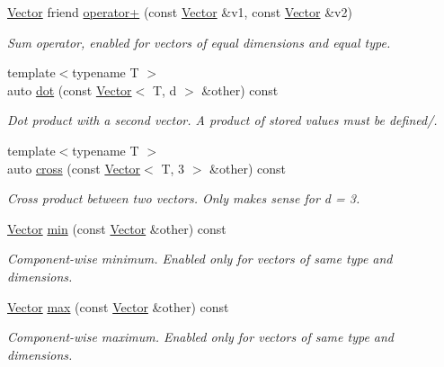 \begin{DoxyCompactItemize}
\hyperlink{classVector}{Vector} friend \hyperlink{classVector_a2f7c7d1b093fc195c0ca3ae40bd87cfc}{operator+} (const \hyperlink{classVector}{Vector} \&v1, const \hyperlink{classVector}{Vector} \&v2)
\begin{DoxyCompactList}\small\item\em Sum operator, enabled for vectors of equal dimensions and equal type. \end{DoxyCompactList}\item 
\hypertarget{classVector_a286518ff6c7c35311c2d471ad7ef7131}{}\label{classVector_a286518ff6c7c35311c2d471ad7ef7131} 
{\footnotesize template$<$typename T $>$ }\\auto \hyperlink{classVector_a286518ff6c7c35311c2d471ad7ef7131}{dot} (const \hyperlink{classVector}{Vector}$<$ T, d $>$ \&other) const
\begin{DoxyCompactList}\small\item\em Dot product with a second vector. A product of stored values must be defined/. \end{DoxyCompactList}\item 
\hypertarget{classVector_a6b8030240b7ab36049f21599f75efa26}{}\label{classVector_a6b8030240b7ab36049f21599f75efa26} 
{\footnotesize template$<$typename T $>$ }\\auto \hyperlink{classVector_a6b8030240b7ab36049f21599f75efa26}{cross} (const \hyperlink{classVector}{Vector}$<$ T, 3 $>$ \&other) const
\begin{DoxyCompactList}\small\item\em Cross product between two vectors. Only makes sense for d = 3. \end{DoxyCompactList}\item 
\hypertarget{classVector_a8bc9e4a97cb055b7b0aa416ac0ed77f8}{}\label{classVector_a8bc9e4a97cb055b7b0aa416ac0ed77f8} 
\hyperlink{classVector}{Vector} \hyperlink{classVector_a8bc9e4a97cb055b7b0aa416ac0ed77f8}{min} (const \hyperlink{classVector}{Vector} \&other) const
\begin{DoxyCompactList}\small\item\em Component-\/wise minimum. Enabled only for vectors of same type and dimensions. \end{DoxyCompactList}\item 
\hypertarget{classVector_ac1247fe7190b8880a7fa8f744ab9cea4}{}\label{classVector_ac1247fe7190b8880a7fa8f744ab9cea4} 
\hyperlink{classVector}{Vector} \hyperlink{classVector_ac1247fe7190b8880a7fa8f744ab9cea4}{max} (const \hyperlink{classVector}{Vector} \&other) const
\begin{DoxyCompactList}\small\item\em Component-\/wise maximum. Enabled only for vectors of same type and dimensions. \end{DoxyCompactList}\end{DoxyCompactItemize}
